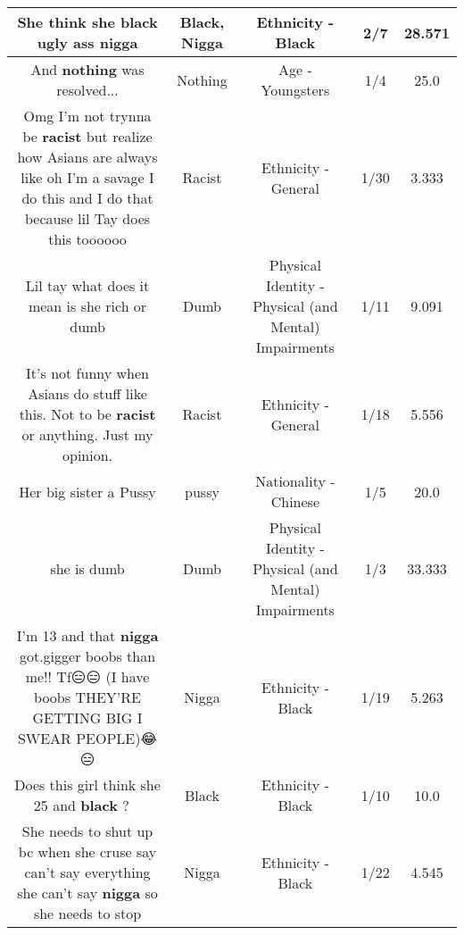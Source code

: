 \documentclass[11pt]{article}
\newlength\mylength
\begin{document}
\begin{center}
\begin{longtable}{|C{.65\mylength}|C{.30\mylength}|C{.12\mylength}|C{.12\mylength}|C{.12\mylength}|}
  \small She think she \textbf{black} ugly ass nigga\normalsize   & Black, Nigga & Ethnicity - Black & 2/7 & 28.571 \\  \hline
  \small And \textbf{nothing} was resolved...\normalsize   & Nothing & Age - Youngsters & 1/4 & 25.0 \\  \hline
  \small Omg I'm not trynna be \textbf{racist} but realize how Asians are always like oh I'm a savage I do this and I do that because lil Tay does this toooooo\normalsize   & Racist & Ethnicity - General & 1/30 & 3.333 \\  \hline
  \small Lil tay what does it mean is she rich or dumb\normalsize   & Dumb & Physical Identity - Physical (and Mental) Impairments & 1/11 & 9.091 \\  \hline
  \small It's not funny when Asians do stuff like this. Not to be \textbf{racist} or anything. Just my opinion.\normalsize   & Racist & Ethnicity - General & 1/18 & 5.556 \\  \hline
  \small Her big sister a Pussy\normalsize   & pussy & Nationality - Chinese & 1/5 & 20.0 \\  \hline
  \small she is dumb\normalsize   & Dumb & Physical Identity - Physical (and Mental) Impairments & 1/3 & 33.333 \\  \hline
  \small I'm 13 and that \textbf{nigga} got.gigger boobs than me!! Tf😑😑 (I have boobs THEY'RE GETTING BIG I SWEAR PEOPLE)😂😑\normalsize   & Nigga & Ethnicity - Black & 1/19 & 5.263 \\  \hline
  \small Does this girl think she 25 and \textbf{black} ?🤣🤣🤣\normalsize   & Black & Ethnicity - Black & 1/10 & 10.0 \\  \hline
  \small She needs to shut up bc when she cruse say can't say everything she can't say \textbf{nigga} so she needs to stop\normalsize   & Nigga & Ethnicity - Black & 1/22 & 4.545 \\  \hline

\end{longtable}
\end{center}
\end{document}
